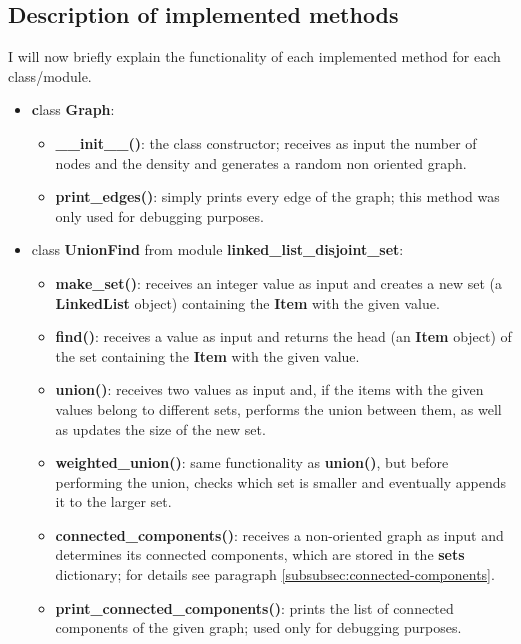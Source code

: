 \documentclass[11pt]{article}
\begin{document}
    \subsection{Description of implemented methods}
    I will now briefly explain the functionality of each implemented method for each class/module.
    \begin{itemize}
        \item \textbf class \textbf{Graph}:
        \begin{itemize}
            \item \textbf{\_\_init\_\_()}: the class constructor; receives as input the number of nodes and the density and generates a random non oriented graph.
            \item \textbf{print\_edges()}: simply prints every edge of the graph; this method was only used for debugging purposes.
        \end{itemize}
        \item class \textbf{UnionFind} from module \textbf{linked\_list\_disjoint\_set}: 
        \begin{itemize}
            \item \textbf{make\_set()}: receives an integer value as input and creates a new set (a \textbf{LinkedList} object) containing the \textbf{Item} with the given value.
            \item \textbf{find()}: receives a value as input and returns the head (an \textbf{Item} object) of the set containing the \textbf{Item} with the given value.
            \item \textbf{union()}: receives two values as input and, if the items with the given values belong to different sets, performs the union between them, as well as updates the size of the new set.
            \item \textbf{weighted\_union()}: same functionality as \textbf{union()}, but before performing the union, checks which set is smaller and eventually appends it to the larger set.
            \item \textbf{connected\_components()}: receives a non-oriented graph as input and determines its connected components, which are stored in the \textbf{sets} dictionary; for details see paragraph \ref{subsubsec:connected-components}.
            \item \textbf{print\_connected\_components()}: prints the list of connected components of the given graph; used only for debugging purposes.
        \end{itemize}

\end{itemize}
\end{document}
